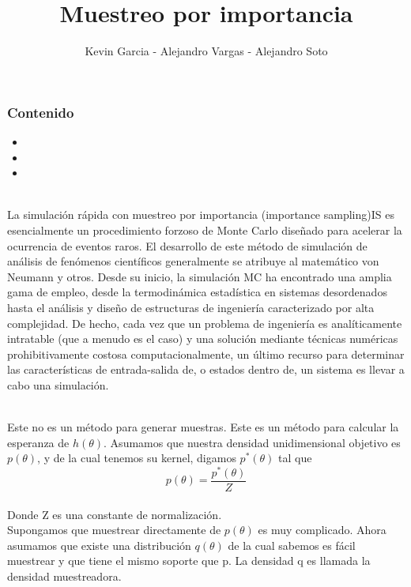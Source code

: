 \documentclass[12pt]{beamer}
\author{Kevin Garcia - Alejandro Vargas - Alejandro Soto}
\title{Muestreo por importancia}
\begin{document}
\begin{frame}
\titlepage
\end{frame}

\begin{frame}
\frametitle{Contenido}
\begin{itemize}
\item
\item
\item
\end{itemize}
\end{frame}

\begin{frame}
~\\La simulación rápida con muestreo por importancia (importance sampling)IS es esencialmente un procedimiento forzoso de Monte Carlo diseñado para acelerar la ocurrencia de eventos raros. El desarrollo de este método de simulación de análisis de fenómenos científicos generalmente se atribuye al matemático von Neumann y otros. Desde su inicio, la simulación MC ha encontrado una amplia gama de empleo, desde la termodinámica estadística en sistemas desordenados hasta el análisis y diseño de estructuras de ingeniería caracterizado por alta complejidad. De hecho, cada vez que un problema de ingeniería es analíticamente intratable (que a menudo es el caso) y una solución mediante técnicas numéricas prohibitivamente costosa computacionalmente, un último recurso para determinar las características de entrada-salida de, o estados dentro de, un sistema es llevar a cabo una simulación.
\end{frame}

\begin{frame}
~\\Este no es un método para generar muestras. Este es un método para calcular la esperanza de $h(\theta)$. Asumamos que nuestra densidad unidimensional objetivo es $p(\theta)$, y de la cual tenemos su kernel, digamos $p^*(\theta)$ tal que
$$p(\theta)=\frac{p^*(\theta)}{Z}$$
~\\Donde Z es una constante de normalización.
~\\Supongamos que muestrear directamente de $p(\theta)$ es muy complicado. Ahora asumamos que existe una distribución $q(\theta)$ de la cual sabemos es fácil muestrear y que tiene el mismo soporte que p. La densidad q es llamada la densidad muestreadora.
\end{frame}
\end{document}
